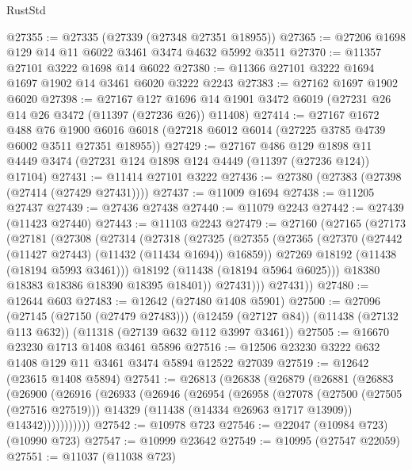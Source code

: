 \begin{lexlean}{RustStd}
\begin{coremodule}
@27355 := @27335 (@27339 (@27348 @27351 @18955))
@27365 := @27206 @1698 @129 @14 @11 @6022 @3461 @3474 @4632 @5992 @3511
@27370 := @11357 @27101 @3222 @1698 @14 @6022
@27380 := @11366 @27101 @3222 @1694 @1697 @1902 @14 @3461 @6020 @3222 @2243
@27383 := @27162 @1697 @1902 @6020
@27398 := @27167
    @127
    @1696
    @14
    @1901
    @3472
    @6019
    (@27231 @26 @14 @26 @3472 (@11397 (@27236 @26)) @11408)
@27414 := @27167
    @1672
    @488
    @76
    @1900
    @6016
    @6018
    (@27218 @6012 @6014 (@27225 @3785 @4739 @6002 @3511 @27351 @18955))
@27429 := @27167
    @486
    @129
    @1898
    @11
    @4449
    @3474
    (@27231 @124 @1898 @124 @4449 (@11397 (@27236 @124)) @17104)
@27431 := @11414 @27101 @3222
@27436 := @27380 (@27383 (@27398 (@27414 (@27429 @27431))))
@27437 := @11009 @1694
@27438 := @11205 @27437
@27439 := @27436 @27438
@27440 := @11079 @2243
@27442 := @27439 (@11423 @27440)
@27443 := @11103 @2243
@27479 := @27160
    (@27165
      (@27173
        (@27181
          (@27308
            (@27314
              (@27318
                (@27325
                  (@27355
                    (@27365
                      (@27370 (@27442 (@11427 @27443) (@11432 (@11434 @1694)) @16859))
                      @27269
                      @18192
                      (@11438 (@18194 @5993 @3461)))
                    @18192
                    (@11438 (@18194 @5964 @6025)))
                  @18380
                  @18383
                  @18386
                  @18390
                  @18395
                  @18401))
              @27431)))
        @27431))
@27480 := @12644 @603
@27483 := @12642 (@27480 @1408 @5901)
@27500 := @27096
    (@27145 (@27150 (@27479 @27483)))
    (@12459 (@27127 @84))
    (@11438 (@27132 @113 @632))
    (@11318 (@27139 @632 @112 @3997 @3461))
@27505 := @16670 @23230 @1713 @1408 @3461 @5896
@27516 := @12506 @23230 @3222 @632 @1408 @129 @11 @3461 @3474 @5894 @12522 @27039
@27519 := @12642 (@23615 @1408 @5894)
@27541 := @26813
    (@26838
      (@26879
        (@26881
          (@26883
            (@26900
              (@26916
                (@26933
                  (@26946
                    (@26954
                      (@26958
                        (@27078
                          (@27500 (@27505 (@27516 @27519)))
                          @14329
                          (@11438 (@14334 @26963 @1717 @13909))
                          @14342)))))))))))
@27542 := @10978 @723
@27546 := @22047 (@10984 @723) (@10990 @723)
@27547 := @10999 @23642
@27549 := @10995 (@27547 @22059)
@27551 := @11037 (@11038 @723)

\end{coremodule}
\end{lexlean}
